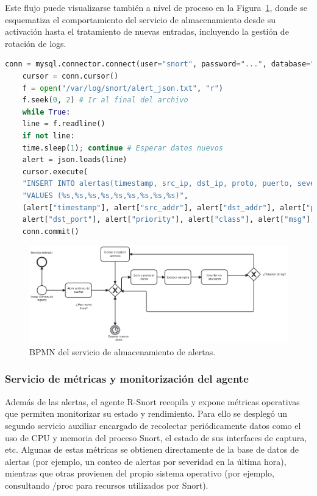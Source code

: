 \documentclass[11pt,a4paper,twoside]{report}
\begin{document}
Este flujo puede visualizarse también a nivel de proceso en la Figura~\ref{fig:bpmn-servicio-ingesta}, donde se esquematiza el comportamiento del servicio de almacenamiento desde su activación hasta el tratamiento de nuevas entradas, incluyendo la gestión de rotación de logs.

\begin{lstlisting}[language=Python, caption={Esquema simplificado del servicio de almacenamiento de alertas.}, label={lst:ingest}]
	conn = mysql.connector.connect(user="snort", password="...", database="snortDB") #Implementación real con variables de entorno obtenidas de un fichero de configuración
	cursor = conn.cursor()
	f = open("/var/log/snort/alert_json.txt", "r")
	f.seek(0, 2) # Ir al final del archivo
	while True:
	line = f.readline()
	if not line:
	time.sleep(1); continue # Esperar datos nuevos
	alert = json.loads(line)
	cursor.execute(
	"INSERT INTO alertas(timestamp, src_ip, dst_ip, proto, puerto, severidad, clase, mensaje, agente_id) "
	"VALUES (%s,%s,%s,%s,%s,%s,%s,%s,%s)",
	(alert["timestamp"], alert["src_addr"], alert["dst_addr"], alert["proto"],
	alert["dst_port"], alert["priority"], alert["class"], alert["msg"], AGENTE_ID))
	conn.commit()
\end{lstlisting}

\begin{figure}[H]
	\centering
	\includegraphics[width=1\textwidth]{documento/23.png}
	\caption{BPMN del servicio de almacenamiento de alertas.}
	\label{fig:bpmn-servicio-ingesta}
\end{figure}

\subsubsection{Servicio de métricas y monitorización del agente}

Además de las alertas, el agente R-Snort recopila y expone métricas operativas que permiten monitorizar su estado y rendimiento. Para ello se desplegó un segundo servicio auxiliar encargado de recolectar periódicamente datos como el uso de CPU y memoria del proceso Snort, el estado de sus interfaces de captura, etc. Algunas de estas métricas se obtienen directamente de la base de datos de alertas (por ejemplo, un conteo de alertas por severidad en la última hora), mientras que otras provienen del propio sistema operativo (por ejemplo, consultando /proc para recursos utilizados por Snort).\newline
\end{document}
